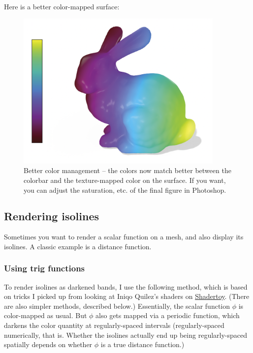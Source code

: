 \documentclass[10pt]{article}
\begin{document}
Here is a better color-mapped surface:
\begin{figure}[H]
    \centering
    \includegraphics[width=4in]{images/better-color-management.png}
    \caption{Better color management -- the colors now match better between the colorbar and the texture-mapped color on the surface. If you want, you can adjust the saturation, etc. of the final figure in Photoshop.}
    \label{fig:better-color-management}
\end{figure}

\subsection{Rendering isolines}
Sometimes you want to render a scalar function on a mesh, and also display its isolines. A classic example is a distance function.

\subsubsection{Using trig functions}
To render isolines as darkened bands, I use the following method, which is based on tricks I picked up from looking at Iniqo Quilez's shaders on \href{shadertoy.com}{Shadertoy}. (There are also simpler methods, described below.) Essentially, the scalar function $\phi$ is color-mapped as usual. But $\phi$ also gets mapped via a periodic function, which darkens the color quantity at regularly-spaced intervals (regularly-spaced numerically, that is. Whether the isolines actually end up being regularly-spaced spatially depends on whether $\phi$ is a true distance function.)
\end{document}
